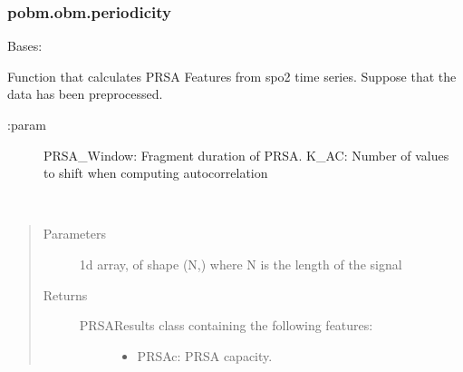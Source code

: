 \documentclass[letterpaper,10pt,english]{sphinxmanual}
\begin{document}
\subsubsection{pobm.obm.periodicity}
\label{\detokenize{pobm.obm:module-pobm.obm.periodicity}}\label{\detokenize{pobm.obm:pobm-obm-periodicity}}

\begin{fulllineitems}
\label{\detokenize{pobm.obm:pobm.obm.periodicity.PRSAMeasures}}
Bases: 

Function that calculates PRSA Features from spo2 time series.
Suppose that the data has been preprocessed.
\begin{description}
\item[{:param}] \leavevmode
PRSA\_Window: Fragment duration of PRSA.
K\_AC: Number of values to shift when computing autocorrelation

\end{description}

\begin{fulllineitems}
\label{\detokenize{pobm.obm:pobm.obm.periodicity.PRSAMeasures.compute}}~\begin{quote}\begin{description}
\item[{Parameters}] \leavevmode
{} \textendash{} 1\sphinxhyphen{}d array, of shape (N,) where N is the length of the signal

\item[{Returns}] \leavevmode
\begin{description}
\item[{PRSAResults class containing the following features:}] \leavevmode\begin{itemize}
\item {} 
PRSAc: PRSA capacity.


\end{itemize}
\end{description}
\end{description}
\end{quote}
\end{fulllineitems}
\end{fulllineitems}
\end{document}
